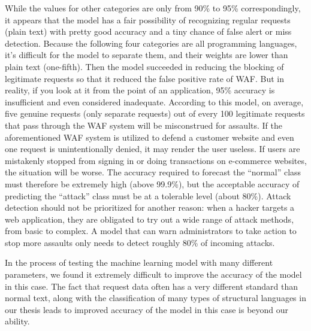 While the values for other categories are only from 90\% to 95\% correspondingly, it appears that the model has a fair possibility of recognizing regular requests (plain text) with pretty good accuracy and a tiny chance of false alert or miss detection. Because the following four categories are all programming languages, it's difficult for the model to separate them, and their weights are lower than plain text (one-fifth). Then the model succeeded in reducing the blocking of legitimate requests so that it reduced the false positive rate of WAF. But in reality, if you look at it from the point of an application, 95\% accuracy is insufficient and even considered inadequate. According to this model, on average, five genuine requests (only separate requests) out of every 100 legitimate requests that pass through the WAF system will be misconstrued for assaults. If the aforementioned WAF system is utilized to defend a customer website and even one request is unintentionally denied, it may render the user useless. If users are mistakenly stopped from signing in or doing transactions on e-commerce websites, the situation will be worse. The accuracy required to forecast the ``normal'' class must therefore be extremely high (above 99.9\%), but the acceptable accuracy of predicting the ``attack'' class must be at a tolerable level (about 80\%). Attack detection should not be prioritized for another reason: when a hacker targets a web application, they are obligated to try out a wide range of attack methods, from basic to complex. A model that can warn administrators to take action to stop more assaults only needs to detect roughly 80\% of incoming attacks.

In the process of testing the machine learning model with many different parameters, we found it extremely difficult to improve the accuracy of the model in this case. The fact that request data often has a very different standard than normal text, along with the classification of many types of structural languages in our thesis leads to improved accuracy of the model in this case is beyond our ability.

